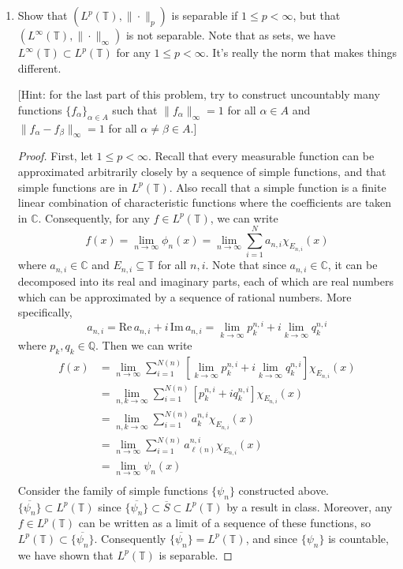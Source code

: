 \documentclass[11pt,oneside,english]{amsart}
\theoremstyle{definition}
\newcommand{\lom}[2]{\lim_{{#1}\rightarrow{#2}}}
\newcommand{\MB}[1]{\mathbb{#1}}
\begin{document}
\rightline{\today}



\vspace{5mm}
\begin{enumerate}
\itemsep7mm

\item Show that $(L^p(\MB{T}),\|\cdot\|_p)$ is separable if $1\leq p<\infty$, but that $(L^\infty(\MB{T}),\|\cdot\|_\infty)$ is not separable. Note that as sets, we have $L^\infty(\MB{T})\subset L^p(\MB{T})$ for any $1\leq p<\infty$. It's really the norm that makes things different. 

[Hint: for the last part of this problem, try to construct uncountably many functions $\{f_\alpha\}_{\alpha\in A}$ such that $\|f_\alpha\|_\infty=1$ for all $\alpha\in A$ and $\|f_\alpha-f_\beta\|_\infty=1$ for all $\alpha\neq \beta\in A$.]

\begin{proof}
First, let $1\leq p<\infty$. Recall that every measurable function can be approximated arbitrarily closely by a sequence of simple functions, and that simple functions are in $L^p(\MB{T})$. Also recall that a simple function is a finite linear combination of characteristic functions where the coefficients are taken in $\MB{C}$. Consequently, for any $f\in L^p(\MB{T})$, we can write
\[
f(x)=\lom{n}{\infty}\phi_n(x)=\lom{n}{\infty}\sum_{i=1}^Na_{n,i}\chi_{E_{n,i}}(x)
\]
where $a_{n,i}\in\MB{C}$ and $E_{n,i}\subseteq\MB{T}$ for all $n,i$. Note that since $a_{n,i}\in\MB{C}$, it can be decomposed into its real and imaginary parts, each of which are real numbers which can be approximated by a sequence of rational numbers. More specifically,
\[
a_{n,i}=\text{Re}\,a_{n,i}+i\,\text{Im}\,a_{n,i}=\lom{k}{\infty}p^{n,i}_k+i\lom{k}{\infty}q_k^{n,i}
\]
where $p_k,q_k\in\MB{Q}$. Then we can write
\begin{align*}
f(x)&=\lom{n}{\infty}\sum_{i=1}^{N(n)}\left[\lom{k}{\infty}p^{n,i}_k+i\lom{k}{\infty}q_k^{n,i}\right]\chi_{E_{n,i}}(x)\\[2mm]
&=\lom{n,k}{\infty}\sum_{i=1}^{N(n)}\left[p^{n,i}_k+iq_k^{n,i}\right]\chi_{E_{n,i}}(x)\\[2mm]
&=\lom{n,k}{\infty}\sum_{i=1}^{N(n)}a_k^{n,i}\chi_{E_{n,i}}(x)\\[2mm]
&=\lom{n}{\infty}\sum_{i=1}^{N(n)}a_{\ell(n)}^{n,i}\chi_{E_{n,i}}(x)\\[2mm]
&=\lom{n}{\infty}\psi_n(x)\\[2mm]
\end{align*}
Consider the family of simple functions $\{\psi_n\}$ constructed above. $\overline{\{\psi_n\}}\subset L^p(\MB{T})$ since $\overline{\{\psi_n\}}\subset \overline{S}\subset L^p(\MB{T})$ by a result in class. Moreover, any $f\in L^p(\MB{T})$ can be written as a limit of a sequence of these functions, so $L^p(\MB{T})\subset \overline{\{\psi_n\}}$. Consequently $\overline{\{\psi_n\}}=L^p(\MB{T})$, and since $\{\psi_n\}$ is countable, we have shown that $L^p(\MB{T})$ is separable.


\end{proof}
\end{enumerate}
\end{document}
